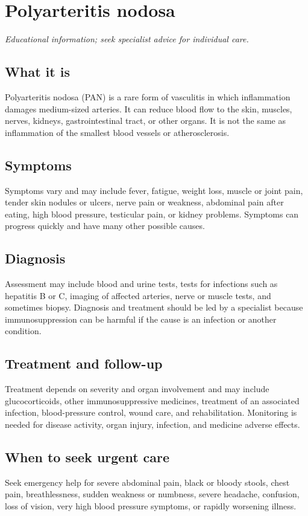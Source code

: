 \chapter{Polyarteritis nodosa}

\medskip
\noindent\textit{Educational information; seek specialist advice for individual care.}

\section*{What it is}
Polyarteritis nodosa (PAN) is a rare form of vasculitis in which inflammation damages medium-sized arteries. It can reduce blood flow to the skin, muscles, nerves, kidneys, gastrointestinal tract, or other organs. It is not the same as inflammation of the smallest blood vessels or atherosclerosis.

\section*{Symptoms}
Symptoms vary and may include fever, fatigue, weight loss, muscle or joint pain, tender skin nodules or ulcers, nerve pain or weakness, abdominal pain after eating, high blood pressure, testicular pain, or kidney problems. Symptoms can progress quickly and have many other possible causes.

\section*{Diagnosis}
Assessment may include blood and urine tests, tests for infections such as hepatitis B or C, imaging of affected arteries, nerve or muscle tests, and sometimes biopsy. Diagnosis and treatment should be led by a specialist because immunosuppression can be harmful if the cause is an infection or another condition.

\section*{Treatment and follow-up}
Treatment depends on severity and organ involvement and may include glucocorticoids, other immunosuppressive medicines, treatment of an associated infection, blood-pressure control, wound care, and rehabilitation. Monitoring is needed for disease activity, organ injury, infection, and medicine adverse effects.

\section*{When to seek urgent care}
Seek emergency help for severe abdominal pain, black or bloody stools, chest pain, breathlessness, sudden weakness or numbness, severe headache, confusion, loss of vision, very high blood pressure symptoms, or rapidly worsening illness.

